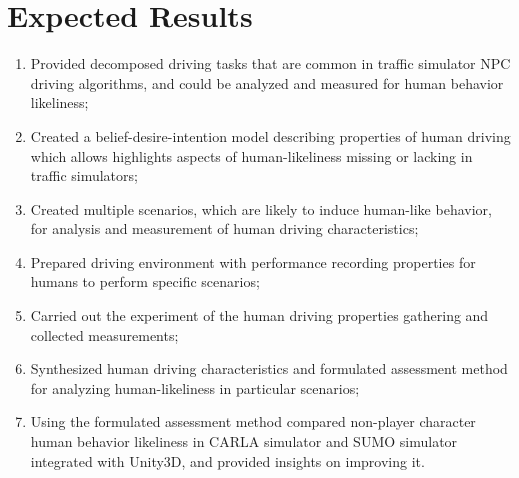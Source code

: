 \documentclass{VUMIFPS-master-intro}
\begin{document}
\section{Expected Results}

%

\begin{enumerate}
	\item Provided decomposed driving tasks that are common in traffic simulator NPC driving algorithms, and could be analyzed and measured for human behavior likeliness;
	\item Created a belief-desire-intention model describing properties of human driving which allows highlights aspects of human-likeliness missing or lacking in traffic simulators;
	\item Created multiple scenarios, which are likely to induce human-like behavior, for analysis and measurement of human driving characteristics;
	\item Prepared driving environment with performance recording properties for humans to perform specific scenarios;
	\item Carried out the experiment of the human driving properties gathering and collected measurements;
	\item Synthesized human driving characteristics and formulated assessment method for analyzing human-likeliness in particular scenarios;
	\item Using the formulated assessment method compared non-player character human behavior likeliness in CARLA simulator and SUMO simulator integrated with Unity3D, and provided insights on improving it.
	
\end{enumerate}
\end{document}
